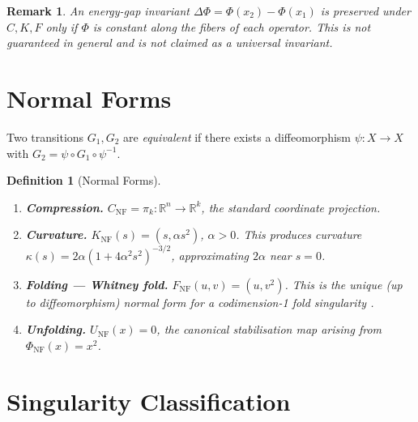 \documentclass[14pt,a4paper]{extarticle}
\newtheorem{definition}{Definition}[section]
\newtheorem{remark}{Remark}[section]
\begin{document}
\begin{remark}
An energy-gap invariant $\Delta\Phi = \Phi(x_2) - \Phi(x_1)$ is
preserved under $C, K, F$ only if $\Phi$ is constant along the fibers
of each operator.
This is not guaranteed in general and is not claimed as a universal
invariant.
\end{remark}

\section{Normal Forms}
\label{sec:normalforms}

Two transitions $G_1, G_2$ are \emph{equivalent} if there exists a
diffeomorphism $\psi : X \to X$ with $G_2 = \psi \circ G_1 \circ
\psi^{-1}$.

\begin{definition}[Normal Forms]
\label{def:normalforms}
\begin{enumerate}[label=\textbf{NF\arabic*.},leftmargin=3em]
  \item \textbf{Compression.}
    $C_\mathrm{NF} = \pi_k : \mathbb{R}^n \to \mathbb{R}^k$,
    the standard coordinate projection.

  \item \textbf{Curvature.}
    $K_\mathrm{NF}(s) = (s, \alpha s^2)$, $\alpha > 0$.
    This produces curvature $\kappa(s) = 2\alpha(1 + 4\alpha^2 s^2)^{-3/2}$,
    approximating $2\alpha$ near $s = 0$.

  \item \textbf{Folding --- Whitney fold.}
    $F_\mathrm{NF}(u,v) = (u, v^2)$.
    This is the unique (up to diffeomorphism) normal form for a
    codimension-1 fold singularity \cite{Arnold1986}.

  \item \textbf{Unfolding.}
    $U_\mathrm{NF}(x) = 0$, the canonical stabilisation map arising
    from $\Phi_\mathrm{NF}(x) = x^2$.
\end{enumerate}
\end{definition}

\section{Singularity Classification}
\label{sec:singularities}
\end{document}
